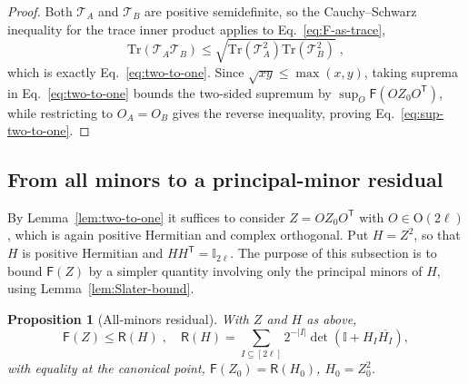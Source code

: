 \documentclass[aps,prl,twocolumn,superscriptaddress,reprint,longbibliography,nofootinbib]{revtex4-2}
\newtheorem{proposition}{Proposition}
\newcommand{\trans}{\mathsf{T}}
\begin{document}
\begin{proof}
Both $\mathcal{T}_A$ and $\mathcal{T}_B$ are positive semidefinite, so the Cauchy--Schwarz inequality for the trace inner product applies to Eq.~\eqref{eq:F-as-trace},
\begin{equation}
    \mathrm{Tr}\!\left(\mathcal{T}_A\mathcal{T}_B\right)\le\sqrt{\mathrm{Tr}\!\left(\mathcal{T}_A^2\right)\mathrm{Tr}\!\left(\mathcal{T}_B^2\right)}\;,
\end{equation}
which is exactly Eq.~\eqref{eq:two-to-one}. Since $\sqrt{xy}\le\max(x,y)$, taking suprema in Eq.~\eqref{eq:two-to-one} bounds the two-sided supremum by $\sup_O\mathsf{F}(OZ_0O^{\trans})$, while restricting to $O_A=O_B$ gives the reverse inequality, proving Eq.~\eqref{eq:sup-two-to-one}.
\end{proof}


\subsection{From all minors to a principal-minor residual}
\label{app:proof:residual}

By Lemma~\ref{lem:two-to-one} it suffices to consider $Z=OZ_0O^{\trans}$ with $O\in\mathrm{O}(2\ell)$,  which is again positive Hermitian and complex orthogonal. Put $H=Z^2$, so that $H$ is positive Hermitian and $HH^{\trans}=\mathbb{I}_{2\ell}$.
The purpose of this subsection is to bound $\mathsf{F}(Z)$ by a simpler quantity involving only the principal minors of $H$, using Lemma~\ref{lem:Slater-bound}.
\begin{proposition}[All-minors residual]
\label{prop:residual}
With $Z$ and $H$ as above,
\begin{equation}
    \mathsf{F}(Z)\le \mathsf{R}(H)\;,\quad \mathsf{R}(H)=\sum_{I\subseteq[2\ell]}2^{-|I|}\det\!\left(\mathbb{I}+H_I\overline{H_I}\right),
    \label{eq:R-definition}
\end{equation}
with equality at the canonical point, $\mathsf{F}(Z_0)=\mathsf{R}(H_0)$, $H_0=Z_0^2$.
\end{proposition}
\end{document}
